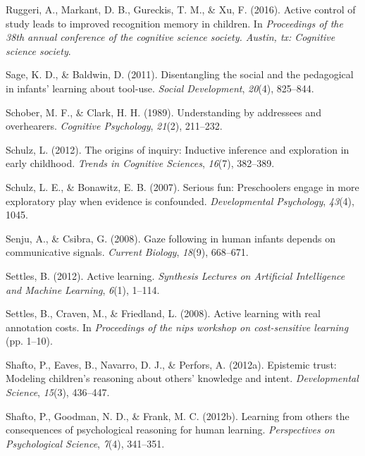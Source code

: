 \documentclass[oneside]{report}
\begin{document}
\leavevmode\hypertarget{ref-ruggeri2016active}{}%
Ruggeri, A., Markant, D. B., Gureckis, T. M., \& Xu, F. (2016). Active
control of study leads to improved recognition memory in children. In
\emph{Proceedings of the 38th annual conference of the cognitive science
society. Austin, tx: Cognitive science society}.

\leavevmode\hypertarget{ref-sage2011disentangling}{}%
Sage, K. D., \& Baldwin, D. (2011). Disentangling the social and the
pedagogical in infants' learning about tool-use. \emph{Social
Development}, \emph{20}(4), 825--844.

\leavevmode\hypertarget{ref-schober1989understanding}{}%
Schober, M. F., \& Clark, H. H. (1989). Understanding by addressees and
overhearers. \emph{Cognitive Psychology}, \emph{21}(2), 211--232.

\leavevmode\hypertarget{ref-schulz2012origins}{}%
Schulz, L. (2012). The origins of inquiry: Inductive inference and
exploration in early childhood. \emph{Trends in Cognitive Sciences},
\emph{16}(7), 382--389.

\leavevmode\hypertarget{ref-schulz2007serious}{}%
Schulz, L. E., \& Bonawitz, E. B. (2007). Serious fun: Preschoolers
engage in more exploratory play when evidence is confounded.
\emph{Developmental Psychology}, \emph{43}(4), 1045.

\leavevmode\hypertarget{ref-senju2008gaze}{}%
Senju, A., \& Csibra, G. (2008). Gaze following in human infants depends
on communicative signals. \emph{Current Biology}, \emph{18}(9),
668--671.

\leavevmode\hypertarget{ref-settles2012active}{}%
Settles, B. (2012). Active learning. \emph{Synthesis Lectures on
Artificial Intelligence and Machine Learning}, \emph{6}(1), 1--114.

\leavevmode\hypertarget{ref-settles2008active}{}%
Settles, B., Craven, M., \& Friedland, L. (2008). Active learning with
real annotation costs. In \emph{Proceedings of the nips workshop on
cost-sensitive learning} (pp. 1--10).

\leavevmode\hypertarget{ref-shafto2012epistemic}{}%
Shafto, P., Eaves, B., Navarro, D. J., \& Perfors, A. (2012a). Epistemic
trust: Modeling children's reasoning about others' knowledge and intent.
\emph{Developmental Science}, \emph{15}(3), 436--447.

\leavevmode\hypertarget{ref-shafto2012learning}{}%
Shafto, P., Goodman, N. D., \& Frank, M. C. (2012b). Learning from
others the consequences of psychological reasoning for human learning.
\emph{Perspectives on Psychological Science}, \emph{7}(4), 341--351.
\end{document}

